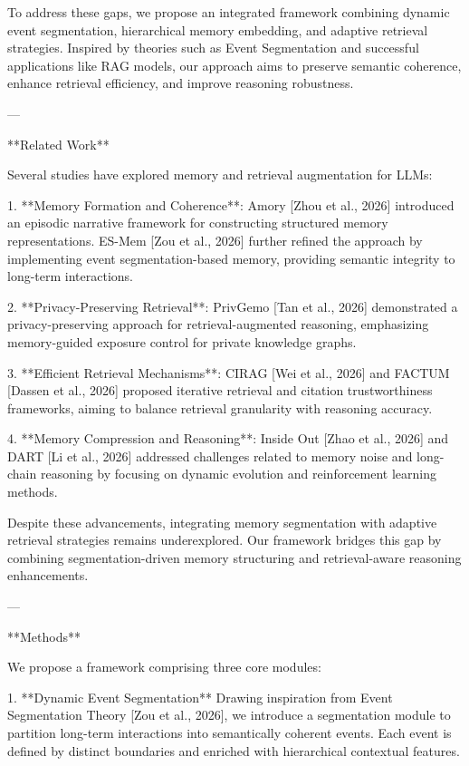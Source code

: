 To address these gaps, we propose an integrated framework combining dynamic event segmentation, hierarchical memory embedding, and adaptive retrieval strategies. Inspired by theories such as Event Segmentation and successful applications like RAG models, our approach aims to preserve semantic coherence, enhance retrieval efficiency, and improve reasoning robustness.  

---

**Related Work**  

Several studies have explored memory and retrieval augmentation for LLMs:  

1. **Memory Formation and Coherence**: Amory [Zhou et al., 2026] introduced an episodic narrative framework for constructing structured memory representations. ES-Mem [Zou et al., 2026] further refined the approach by implementing event segmentation-based memory, providing semantic integrity to long-term interactions.  

2. **Privacy-Preserving Retrieval**: PrivGemo [Tan et al., 2026] demonstrated a privacy-preserving approach for retrieval-augmented reasoning, emphasizing memory-guided exposure control for private knowledge graphs.  

3. **Efficient Retrieval Mechanisms**: CIRAG [Wei et al., 2026] and FACTUM [Dassen et al., 2026] proposed iterative retrieval and citation trustworthiness frameworks, aiming to balance retrieval granularity with reasoning accuracy.  

4. **Memory Compression and Reasoning**: Inside Out [Zhao et al., 2026] and DART [Li et al., 2026] addressed challenges related to memory noise and long-chain reasoning by focusing on dynamic evolution and reinforcement learning methods.  

Despite these advancements, integrating memory segmentation with adaptive retrieval strategies remains underexplored. Our framework bridges this gap by combining segmentation-driven memory structuring and retrieval-aware reasoning enhancements.

---

**Methods**  

We propose a framework comprising three core modules:  

1. **Dynamic Event Segmentation**  
   Drawing inspiration from Event Segmentation Theory [Zou et al., 2026], we introduce a segmentation module to partition long-term interactions into semantically coherent events. Each event is defined by distinct boundaries and enriched with hierarchical contextual features.  

